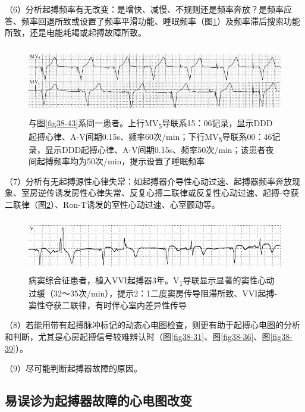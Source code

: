 （6）分析起搏频率有无改变：是增快、减慢、不规则还是频率奔放？是频率应答、频率回退所致或设置了频率平滑功能、睡眠频率（图\ref{fig38-45}）及频率滞后搜索功能所致，还是电能耗竭或起搏故障所致。

\begin{figure}[!htbp]
 \centering
 \includegraphics[width=5.58333in,height=1.1875in]{./images/Image00648.jpg}
 \captionsetup{justification=centering}
 \caption{与图\ref{fig38-43}系同一患者。上行MV\textsubscript{5}导联系15：06记录，显示DDD起搏心律、A-V间期0.15s、频率60次/min；下行MV\textsubscript{5}导联系00：46记录，显示DDD起搏心律、A-V间期0.15s、频率50次/min；该患者夜间起搏频率均为50次/min，提示设置了睡眠频率}
 \label{fig38-45}
  \end{figure} 


（7）分析有无起搏源性心律失常：如起搏器介导性心动过速、起搏器频率奔放现象、室房逆传诱发房性心律失常、反复心搏二联律或反复性心动过速、起搏-夺获二联律（图\ref{fig38-46}）、Ron-T诱发的室性心动过速、心室颤动等。

\begin{figure}[!htbp]
 \centering
 \includegraphics[width=5.57292in,height=0.92708in]{./images/Image00649.jpg}
 \captionsetup{justification=centering}
 \caption{病窦综合征患者，植入VVI起搏器3年。V\textsubscript{1}导联显示显著的窦性心动过缓（32～35次/min），提示2：1二度窦房传导阻滞所致、VVI起搏-窦性夺获二联律，有时伴心室内差异性传导}
 \label{fig38-46}
  \end{figure} 


（8）若能用带有起搏脉冲标记的动态心电图检查，则更有助于起搏心电图的分析和判断，尤其是心房起搏信号较难辨认时（图\ref{fig38-31}、图\ref{fig38-36}、图\ref{fig38-39}）。

（9）尽可能判断起搏器故障的原因。

\protect\hypertarget{text00045.htmlux5cux23subid507}{}{}

\subsection{易误诊为起搏器故障的心电图改变}

